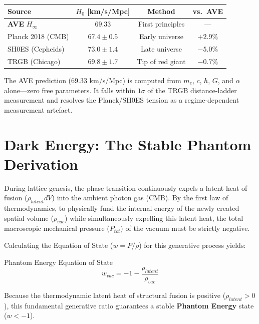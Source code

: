 \begin{center}
\small
\renewcommand{\arraystretch}{1.2}
\begin{tabular}{lccc}
\toprule
\textbf{Source} & \textbf{$H_0$ [km/s/Mpc]} & \textbf{Method} & \textbf{vs.\ AVE} \\
\midrule
\textbf{AVE} $H_\infty$   & $\mathbf{69.33}$ & First principles & --- \\
Planck 2018 (CMB)   & $67.4 \pm 0.5$  & Early universe  & $+2.9\%$ \\
SH0ES (Cepheids)    & $73.0 \pm 1.4$  & Late universe   & $-5.0\%$ \\
TRGB (Chicago)      & $69.8 \pm 1.7$  & Tip of red giant & $-0.7\%$ \\
\bottomrule
\end{tabular}
\end{center}

\noindent The AVE prediction ($69.33$ km/s/Mpc) is computed from $m_e$, $c$, $\hbar$, $G$, and $\alpha$ alone---zero free parameters. It falls within $1\sigma$ of the TRGB distance-ladder measurement and resolves the Planck/SH0ES tension as a regime-dependent measurement artefact.

\section{Dark Energy: The Stable Phantom Derivation}

During lattice genesis, the phase transition continuously expels a latent heat of fusion
($\rho_{latent}dV$) into the ambient photon gas (CMB). By the first law of thermodynamics, to physically fund the internal energy of the newly created spatial volume ($\rho_{vac}$) while simultaneously
expelling this latent heat, the total macroscopic mechanical pressure ($P_{tot}$) of the vacuum
must be strictly negative.

Calculating the Equation of State ($w=P/\rho$) for this generative process yields:

\begin{resultbox}{Phantom Energy Equation of State}
\begin{equation}
w_{vac}=-1-\frac{\rho_{latent}}{\rho_{vac}}
\end{equation}
\end{resultbox}

Because the thermodynamic latent heat of structural fusion is positive ($\rho_{latent} > 0$), this fundamental generative ratio guarantees a stable \textbf{Phantom Energy} state ($w < -1$). 

